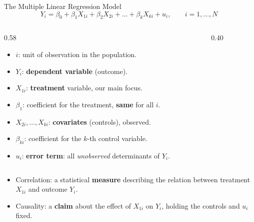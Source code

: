 \documentclass[9pt,aspectratio=169]{beamer}
\begin{document}
\begin{frame}{The Multiple Linear Regression Model}
\linespread{1.2}\selectfont
  \[
    Y_i = \beta_0 + \beta_1 X_{1i} + \beta_2 X_{2i} + \dots + \beta_k X_{ki} + u_i, \qquad i=1,\dots,N
  \]
  \vspace{-0.2cm}
  \begin{columns}[c]
  \begin{column}{0.58\textwidth}
  \begin{itemize}
    \item $i$: unit of observation in the population.
    \item $Y_i$: \textbf{dependent variable} (outcome).
    \item $X_{1i}$: \textbf{treatment} variable, our main focus.
    \item $\beta_{1}$: coefficient for the treatment, \textbf{same} for all $i$. \pause
    \item $X_{2i},\dots,X_{ki}$: \textbf{covariates} (controls), observed.
    \item $\beta_{ki}$: coefficient for the $k$-th control variable.
    \item $u_i$: \textbf{error term}: all \emph{unobserved} determinants of $Y_i$.
  \end{itemize}
  \end{column}
  \begin{column}{0.40\textwidth}
  \centering
  \end{column}
  \end{columns}
  \medskip
  \pause
  \begin{block}{}
    \begin{itemize}
      \item Correlation: a statistical \textbf{measure} describing the relation between treatment $X_{1i}$ and outcome $Y_i$.
      \item Causality: a \textbf{claim} about the effect of $X_{1i}$ on $Y_i$, holding the controls and $u_i$ fixed.
    \end{itemize}
  \end{block}
\end{frame}
\end{document}
